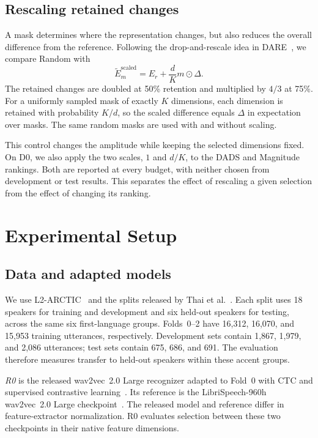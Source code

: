 \documentclass{article}
\begin{document}
\subsection{Rescaling retained changes}
A mask determines where the representation changes, but also reduces the overall difference from the reference. Following the drop-and-rescale idea in DARE~\cite{yu2024dare}, we compare Random with
\begin{equation}
 \widetilde E_m^{\mathrm{scaled}}=E_r+\frac{d}{K}m\odot\Delta.
 \label{eq:scale}
\end{equation}
The retained changes are doubled at 50\% retention and multiplied by $4/3$ at 75\%. For a uniformly sampled mask of exactly $K$ dimensions, each dimension is retained with probability $K/d$, so the scaled difference equals $\Delta$ in expectation over masks. The same random masks are used with and without scaling.

This control changes the amplitude while keeping the selected dimensions fixed. On D0, we also apply the two scales, $1$ and $d/K$, to the DADS and Magnitude rankings. Both are reported at every budget, with neither chosen from development or test results. This separates the effect of rescaling a given selection from the effect of changing its ranking.

\section{Experimental Setup}
\label{sec:setup}
\subsection{Data and adapted models}
We use L2-ARCTIC~\cite{zhao2018l2arctic} and the splits released by Thai et al.~\cite{thai2026contrastive}. Each split uses 18 speakers for training and development and six held-out speakers for testing, across the same six first-language groups. Folds~0--2 have 16,312, 16,070, and 15,953 training utterances, respectively. Development sets contain 1,867, 1,979, and 2,086 utterances; test sets contain 675, 686, and 691. The evaluation therefore measures transfer to held-out speakers within these accent groups.

\emph{R0} is the released wav2vec~2.0 Large recognizer adapted to Fold~0 with CTC and supervised contrastive learning~\cite{khosla2020supcon,thai2026contrastive}. Its reference is the LibriSpeech-960h wav2vec~2.0 Large checkpoint~\cite{panayotov2015librispeech}. The released model and reference differ in feature-extractor normalization. R0 evaluates selection between these two checkpoints in their native feature dimensions.
\end{document}

